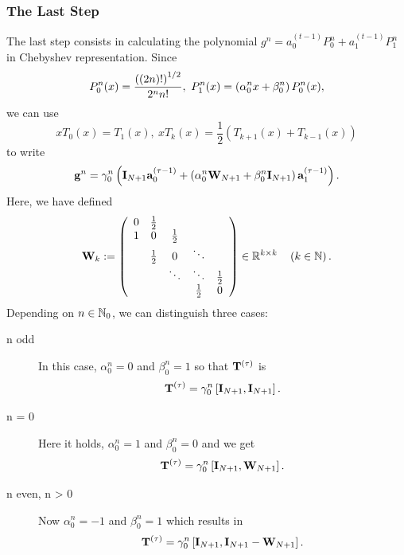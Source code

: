 \subsubsection{The Last Step}
\label{NFSFT:LinearAlgebra:LastStep}
The last step consists in calculating the polynomial $g^{n} = a_{0}^{(t-1)} P_{0}^{n} + a_{1}^{(t-1)} P_{1}^{n}$ in Chebyshev representation. Since 
$$
  P_{0}^n{\hspace{-0.4ex}}\left(x\right) = \frac{\left( \left( 2n \right) ! \right)^{1/2}}{2^n n!},\ P_{1}^n{\hspace{-0.4ex}}\left(x\right) = \left(\alpha_{0}^n x + \beta_{0}^n\right)P_{0}^n(x),
$$ 
we can use 
$$
  xT_{0}(x) = T_{1}(x),\ xT_{k}(x) = \frac{1}{2}\left( T_{k+1}(x) + T_{k-1}(x) \right)
$$ 
to write
$$ 
  \mathbf{g}^{n} = \gamma_{0}^n \left( \mathbf{I}_{N+1} \mathbf{a}_{0}^{(\tau-1)} + \left( \alpha_{0}^n\mathbf{W}_{N+1} + \beta_{0}^n\mathbf{I}_{N+1} \right) \mathbf{a}_{1}^{(\tau-1)} \right).
$$
Here, we have defined
$$
\mathbf{W}_{k} :=
\left(
\begin{array}{ccccccc}
  0 & \frac{1}{2} &             &                           \\
  1 &           0 & \frac{1}{2} &                           \\
    & \frac{1}{2} &           0 & \ddots                    \\
    &             &      \ddots & \ddots      & \frac{1}{2} \\
    &             &             & \frac{1}{2} &           0
\end{array}
\right)
\in \mathbb{R}^{k \times k} \quad \left(k \in \mathbb{N}\right).
$$
Depending on $n \in \mathbb{N}_{0}$, we can distinguish three cases:
\begin{description}
  \item[n odd] In this case, $\alpha_{0}^n = 0$ and $\beta_{0}^n = 1$ so that $\mathbf{T}^{(\tau)}$ is 
    $$
      \mathbf{T}^{(\tau)} = \gamma_{0}^n \left[ \mathbf{I}_{N+1}, \mathbf{I}_{N+1} \right].
    $$
  \item[n = 0] Here it holds, $\alpha_{0}^n = 1$ and $\beta_{0}^n = 0$ and we get $$\mathbf{T}^{(\tau)} = \gamma_{0}^n \left[ \mathbf{I}_{N+1}, \mathbf{W}_{N+1} \right].$$
  \item[n even, n > 0] Now $\alpha_{0}^n = -1$ and $\beta_{0}^n = 1$ which results in $$\mathbf{T}^{(\tau)} = \gamma_{0}^n \left[ \mathbf{I}_{N+1}, \mathbf{I}_{N+1} - \mathbf{W}_{N+1} \right].$$
\end{description}

